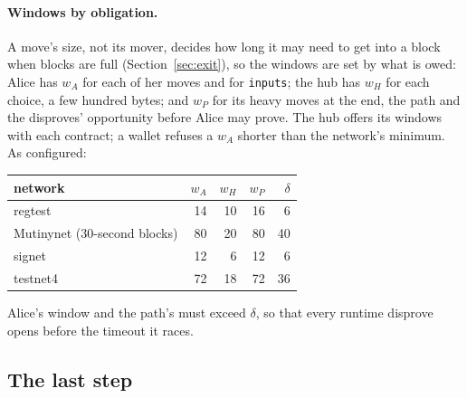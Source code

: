 \documentclass[11pt]{article}
\newcommand{\tx}[1]{\texttt{#1}}
\begin{document}
\paragraph{Windows by obligation.} A move's size, not its mover, decides
how long it may need to get into a block when blocks are full
(Section~\ref{sec:exit}), so the windows are set by what is owed: Alice
has $w_A$ for each of her moves and for \tx{inputs}; the hub has $w_H$
for each choice, a few hundred bytes; and $w_P$ for its heavy moves at
the end, the path and the disproves' opportunity before Alice may prove.
The hub offers its windows with each contract; a wallet refuses a $w_A$
shorter than the network's minimum. As configured:
\begin{center}
\small
\begin{tabular}{lrrrr}
\toprule
network & $w_A$ & $w_H$ & $w_P$ & $\delta$ \\
\midrule
regtest & 14 & 10 & 16 & 6 \\
Mutinynet (30-second blocks) & 80 & 20 & 80 & 40 \\
signet & 12 & 6 & 12 & 6 \\
testnet4 & 72 & 18 & 72 & 36 \\
\bottomrule
\end{tabular}
\end{center}
Alice's window and the path's must exceed $\delta$, so that every
runtime disprove opens before the timeout it races.

\subsection{The last step}
\label{sec:final}
\end{document}

